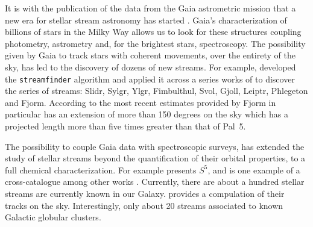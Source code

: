 \documentclass{aa}
\begin{document}
  
  It is with the publication of the data from the Gaia astrometric mission \citep{2016A&A...595A...1G} that a new era for stellar stream astronomy has started  \citep{2024arXiv240519410B}. Gaia's characterization of billions of stars in the Milky Way allows us to look for these structures coupling photometry, astrometry and, for the brightest stars, spectroscopy. The possibility given by Gaia to track stars with coherent movements, over the entirety of the sky, has led to the discovery of dozens of new streams. For example, \citet{2018MNRAS.477.4063M} developed the \texttt{streamfinder} algorithm and applied it across a series works of \citep{2018MNRAS.481.3442M,  2018ApJ...865...85I, 2019ApJ...872..152I} to discover the series of streams: Slidr, Sylgr, Ylgr, Fimbulthul, Svol, Gjoll, Leiptr, Phlegeton and Fjorm.  According to the most recent estimates provided by \citet{2020MNRAS.493.4978S} Fjorm in particular has an extension of more than 150 degrees on the sky which has a projected length more than five times greater than that of Pal~5. 
  
  The possibility to couple Gaia data with spectroscopic surveys, has extended the study of stellar streams beyond the quantification of their orbital properties, to a full chemical characterization. For example \citet{2019MNRAS.490.3508L} presents $S^5$, and is one example of a cross-catalogue among other works \citep{2020AJ....160..181J, 2021ApJ...911..149L, 2022ApJ...928...30L, 2024MNRAS.529.2413U}. Currently, there are about a hundred stellar streams are currently known in our Galaxy. \citet{2023MNRAS.520.5225M} provides a compulation of their tracks on the sky. Interestingly, only about 20 streams associated to known Galactic globular clusters.
\end{document}
